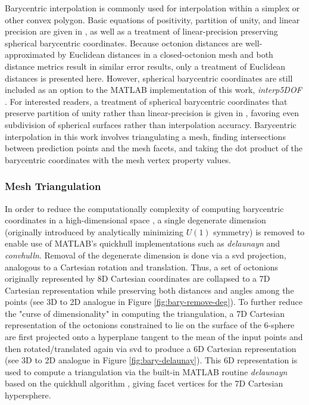 \documentclass[preprint,12pt]{elsarticle}
\begin{document}
Barycentric interpolation is commonly used for interpolation within a simplex or other convex polygon. Basic equations of positivity, partition of unity, and linear precision are given in \cite{langerSphericalBarycentricCoordinates2006}, as well as a treatment of linear-precision preserving spherical barycentric coordinates. Because octonion distances are well-approximated by Euclidean distances in a closed-octonion mesh and both distance metrics result in similar error results, only a treatment of Euclidean distances is presented here. However, spherical barycentric coordinates are still included as an option to the MATLAB implementation of this work, \textit{interp5DOF} \cite{bairdFiveDegreeofFreedom5DOF2020}. For interested readers, a treatment of spherical barycentric coordinates that preserve partition of unity rather than linear-precision is given in \cite{leiNewCoordinateSystem2020}, favoring even subdivision of spherical surfaces rather than interpolation accuracy. Barycentric interpolation in this work involves triangulating a mesh, finding intersections between prediction points and the mesh facets, and taking the dot product of the barycentric coordinates with the mesh vertex property values.

\subsubsection{Mesh Triangulation}
In order to reduce the computationally complexity of computing barycentric coordinates in a high-dimensional space \cite{barberQuickhullAlgorithmConvex1996}, a single degenerate dimension (originally introduced by analytically minimizing $U(1)$ symmetry) is removed to enable use of MATLAB's quickhull \cite{barberQuickhullAlgorithmConvex1996} implementations such as \textit{delaunayn} and \textit{convhulln}. Removal of the degenerate dimension is done via a \gls{svd} projection, analogous to a Cartesian rotation and translation. Thus, a set of octonions originally represented by 8D Cartesian coordinates are collapsed to a 7D Cartesian representation while preserving both distances and angles among the points (see 3D to 2D analogue in Figure \ref{fig:bary-remove-deg}). To further reduce the "curse of dimensionality" in computing the triangulation, a 7D Cartesian representation of the octonions constrained to lie on the surface of the 6-sphere are first projected onto a hyperplane tangent to the mean of the input points and then rotated/translated again via \gls{svd} to produce a 6D Cartesian representation (see 3D to 2D analogue in Figure \ref{fig:bary-delaunay}). This 6D representation is used to compute a triangulation via the built-in MATLAB routine \textit{delaunayn} based on the quickhull algorithm \cite{barberQuickhullAlgorithmConvex1996}, giving facet vertices for the 7D Cartesian hypersphere.
\end{document}
